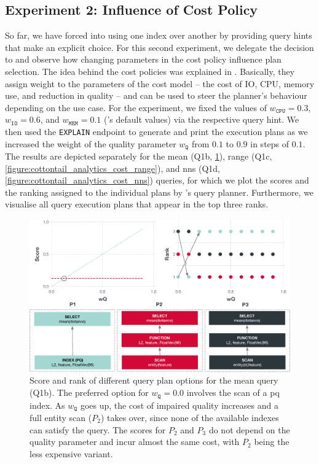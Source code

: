 \subsection{Experiment 2: Influence of Cost Policy}
\label{section:cost_model_evaluation}

So far, we have forced \cottontail{} into using one index over another by providing query hints that make an explicit choice. For this second experiment, we delegate the decision to \cottontail{} and observe how changing parameters in the cost policy influence plan selection. The idea behind the cost policies was explained in . Basically, they assign weight to the parameters of the cost model -- the cost of IO, CPU, memory use, and reduction in quality -- and can be used to steer the planner's behaviour depending on the use case. For the experiment, we fixed the values of $w_{\mathtt{CPU}} = 0.3$, $w_{\mathtt{IO}} = 0.6$, and $ w_{\mathtt{MEM}} = 0.1$ (\cottontail{}'s default values) via the respective query hint. We then used the \texttt{EXPLAIN} endpoint to generate and print the execution plans as we increased the weight of the quality parameter $w_{\mathtt{Q}}$ from $0.1$ to $0.9$ in steps of $0.1$. The results are depicted separately for the mean (Q1b, \ref{figure:cottontail_analytics_cost_mean}), range (Q1c, \ref{figure:cottontail_analytics_cost_range}), and \acrshort{nns} (Q1d, \ref{figure:cottontail_analytics_cost_nns}) queries, for which we plot the scores and the ranking assigned to the individual plans by \cottontail{}'s query planner. Furthermore, we visualise all query execution plans that appear in the top three ranks.

\begin{figure}[tb]
    \centering
    \includegraphics[width=\textwidth]{figures/analytics/analytics-cottontail-cost-mean-annotated}
    \caption{Score and rank of different query plan options for the mean query (Q1b). The preferred option for $w_{\texttt{Q}} = 0.0$ involves the scan of a \acrshort{pq} index. As $w_{\texttt{Q}}$ goes up, the cost of impaired quality increases and a full entity scan ($P_2$) takes over, since none of the available indexes can satisfy the query. The scores for $P_2$ and $P_3$ do not depend on the quality parameter and incur almost the same cost, with $P_2$ being the less expensive variant.}
    \label{figure:cottontail_analytics_cost_mean}
\end{figure}

